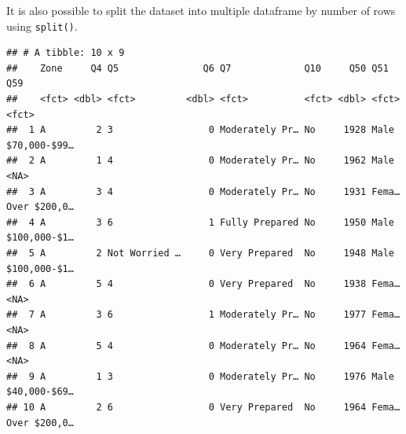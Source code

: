 \documentclass[
]{book}
\newenvironment{Shaded}{\begin{snugshade}}{\end{snugshade}}
\newcommand{\CommentTok}[1]{\textcolor[rgb]{0.56,0.35,0.01}{\textit{#1}}}
\newcommand{\DataTypeTok}[1]{\textcolor[rgb]{0.13,0.29,0.53}{#1}}
\newcommand{\DecValTok}[1]{\textcolor[rgb]{0.00,0.00,0.81}{#1}}
\newcommand{\KeywordTok}[1]{\textcolor[rgb]{0.13,0.29,0.53}{\textbf{#1}}}
\newcommand{\NormalTok}[1]{#1}
\newcommand{\OperatorTok}[1]{\textcolor[rgb]{0.81,0.36,0.00}{\textbf{#1}}}
\newcommand{\StringTok}[1]{\textcolor[rgb]{0.31,0.60,0.02}{#1}}
\begin{document}
It is also possible to split the dataset into multiple dataframe by number of rows using \texttt{split()}.

\begin{Shaded}
\end{Shaded}

\begin{verbatim}
## # A tibble: 10 x 9
##    Zone     Q4 Q5               Q6 Q7             Q10     Q50 Q51   Q59         
##    <fct> <dbl> <fct>         <dbl> <fct>          <fct> <dbl> <fct> <fct>       
##  1 A         2 3                 0 Moderately Pr… No     1928 Male  $70,000-$99…
##  2 A         1 4                 0 Moderately Pr… No     1962 Male  <NA>        
##  3 A         3 4                 0 Moderately Pr… No     1931 Fema… Over $200,0…
##  4 A         3 6                 1 Fully Prepared No     1950 Male  $100,000-$1…
##  5 A         2 Not Worried …     0 Very Prepared  No     1948 Male  $100,000-$1…
##  6 A         5 4                 0 Very Prepared  No     1938 Fema… <NA>        
##  7 A         3 6                 1 Moderately Pr… No     1977 Fema… <NA>        
##  8 A         5 4                 0 Moderately Pr… No     1964 Fema… <NA>        
##  9 A         1 3                 0 Moderately Pr… No     1976 Male  $40,000-$69…
## 10 A         2 6                 0 Very Prepared  No     1964 Fema… Over $200,0…
\end{verbatim}
\end{document}
